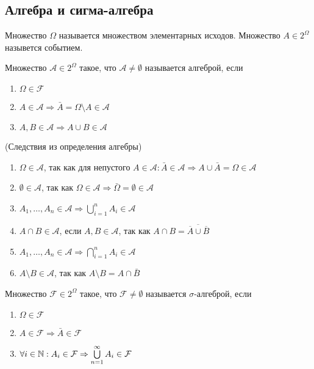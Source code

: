 \documentclass[a4paper, 12pt]{article}
\begin{document}
\subsection{Алгебра и сигма-алгебра}
\begin{definition}
    Множество $\Omega$ называется множеством элементарных исходов. Множество $A\in 2^{\Omega}$ назывется событием.
\end{definition}
\begin{definition}
    Множество $\mathcal{A}\in 2^{\Omega}$ такое, что $\mathcal{A}\ne \emptyset$ называется алгеброй, если
    \begin{enumerate}
        \item $\Omega \in \mathcal{F}$
        \item $A\in \mathcal{A} \Rightarrow \bar{A}=\Omega\setminus A\in \mathcal{A}$
        \item $A,B\in \mathcal{A} \Rightarrow A\cup B\in \mathcal{A}$
    \end{enumerate}
\end{definition}
\begin{statement} (Следствия из определения алгебры)
    \begin{enumerate}
        \item $\Omega\in \mathcal{A}$, так как для непустого $A\in \mathcal{A}: \bar{A}\in \mathcal{A} \Rightarrow A\cup\bar{A}=\Omega\in \mathcal{A}$
        \item $\emptyset\in \mathcal{A}$, так как $\Omega\in \mathcal{A} \Rightarrow \bar{\Omega}=\emptyset\in \mathcal{A}$
        \item $A_1,\dots,A_n \in \mathcal{A} \Rightarrow \bigcup\limits_{i=1}^n A_i\in \mathcal{A}$
        \item $A\cap B\in \mathcal{A}$, если $A,B\in \mathcal{A}$, так как $A\cap B=\overline{\overline{A}\cup\overline{B}}$
        \item $A_1,\dots,A_n \in \mathcal{A} \Rightarrow \bigcap\limits_{i=1}^n A_i\in \mathcal{A}$
        \item $A\setminus B\in \mathcal{A}$, так как $A\setminus B=A\cap \bar{B}$
    \end{enumerate}
\end{statement}
\begin{definition}
    Множество $\mathcal{F}\in 2^{\Omega}$ такое, что $\mathcal{F}\ne \emptyset$ называется $\sigma$-алгеброй, если
    \begin{enumerate}
        \item $\Omega \in \mathcal{F}$
        \item $A\in \mathcal{F} \Rightarrow \bar{A}\in \mathcal{F}$
        \item $\forall i\in \mathbb{N}: A_i\in \mathcal{F} \Rightarrow \bigcup\limits_{n=1}^{\infty}A_i\in \mathcal{F}$
    \end{enumerate} 
\end{definition}
\end{document}
